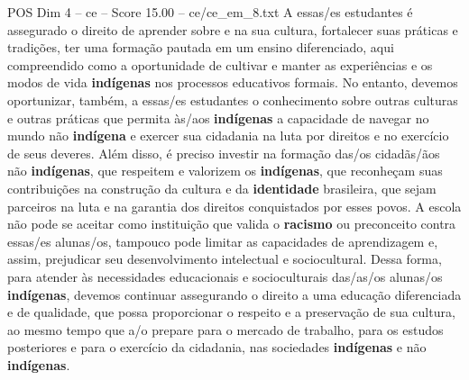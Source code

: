 \begin{textsample}{POS Dim 4 – ce – Score 15.00 – ce/ce\_em\_8.txt}
A essas/es estudantes é assegurado o direito de aprender sobre e na sua cultura, fortalecer suas práticas e tradições, ter uma formação pautada em um ensino diferenciado, aqui compreendido como a oportunidade de cultivar e manter as experiências e os modos de vida \textbf{indígenas} nos processos educativos formais.
No entanto, devemos oportunizar, também, a essas/es estudantes o conhecimento sobre outras culturas e outras práticas que permita às/aos \textbf{indígenas} a capacidade de navegar no mundo não \textbf{indígena} e exercer sua cidadania na luta por direitos e no exercício de seus deveres.
Além disso, é preciso investir na formação das/os cidadãs/ãos não \textbf{indígenas}, que respeitem e valorizem os \textbf{indígenas}, que reconheçam suas contribuições na construção da cultura e da \textbf{identidade} brasileira, que sejam parceiros na luta e na garantia dos direitos conquistados por esses povos.
A escola não pode se aceitar como instituição que valida o \textbf{racismo} ou preconceito contra essas/es alunas/os, tampouco pode limitar as capacidades de aprendizagem e, assim, prejudicar seu desenvolvimento intelectual e sociocultural.
Dessa forma, para atender às necessidades educacionais e socioculturais das/as/os alunas/os \textbf{indígenas}, devemos continuar assegurando o direito a uma educação diferenciada e de qualidade, que possa proporcionar o respeito e a preservação de sua cultura, ao mesmo tempo que a/o prepare para o mercado de trabalho, para os estudos posteriores e para o exercício da cidadania, nas sociedades \textbf{indígenas} e não \textbf{indígenas}.

\end{textsample}

